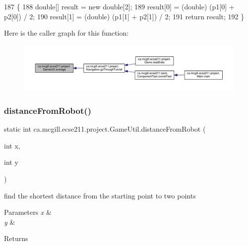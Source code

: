 \begin{DoxyCode}
187                                                      \{
188     \textcolor{keywordtype}{double}[] result = \textcolor{keyword}{new} \textcolor{keywordtype}{double}[2];
189     result[0] = (double) (p1[0] + p2[0]) / 2;
190     result[1] = (double) (p1[1] + p2[1]) / 2;
191     \textcolor{keywordflow}{return} result;
192   \}
\end{DoxyCode}
Here is the caller graph for this function\+:
\nopagebreak
\begin{figure}[H]
\begin{center}
\leavevmode
\includegraphics[width=350pt]{classca_1_1mcgill_1_1ecse211_1_1project_1_1_game_util_ae5c5c445ab84516991219ca3783fcaa4_icgraph}
\end{center}
\end{figure}
\mbox{\label{classca_1_1mcgill_1_1ecse211_1_1project_1_1_game_util_a16770a5be37a6b27cc8c87e76e6d7d08}} 
\subsubsection{\texorpdfstring{distance\+From\+Robot()}{distanceFromRobot()}}
{\footnotesize\ttfamily static int ca.\+mcgill.\+ecse211.\+project.\+Game\+Util.\+distance\+From\+Robot (\begin{DoxyParamCaption}\item[{int}]{x,  }\item[{int}]{y }\end{DoxyParamCaption})\hspace{0.3cm}{\ttfamily [static]}}

find the shortest distance from the starting point to two points 
\begin{DoxyParams}{Parameters}
{\em x} & \\
\hline
{\em y} & \\
\hline
\end{DoxyParams}
\begin{DoxyReturn}{Returns}

\end{DoxyReturn}


